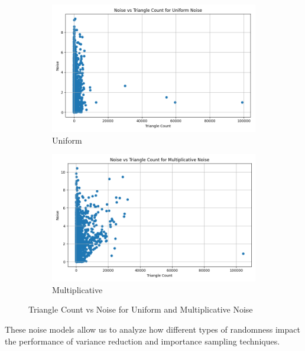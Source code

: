 \documentclass[11pt, margin=1in]{article}
\begin{document}
\begin{figure}[H]
    \centering
    \begin{subfigure}[b]{0.495\textwidth}
        \centering
        \includegraphics[width=\textwidth]{plots/noise-shapes/uniform.png}
        \caption{Uniform}
        \label{fig:uniform_noise}
    \end{subfigure}
    \hfill
    \begin{subfigure}[b]{0.495\textwidth}
        \centering
        \includegraphics[width=\textwidth]{plots/noise-shapes/multiplicative.png}
        \caption{Multiplicative}
        \label{fig:multiplicative_noise}
    \end{subfigure}

    \caption{Triangle Count vs Noise for Uniform and Multiplicative Noise}
    \label{fig:noise_shapes}
\end{figure}

These noise models allow us to analyze how different types of randomness impact the performance of variance reduction and importance sampling techniques.
\end{document}
